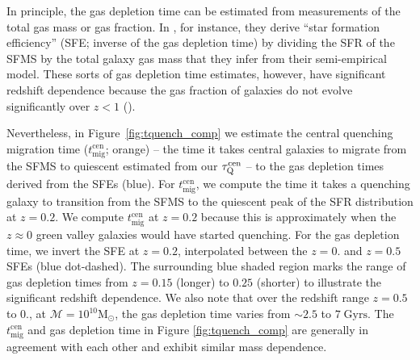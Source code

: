 In principle, the gas depletion time can be estimated from 
measurements of the total gas mass or gas fraction. 
In \cite{Popping:2015aa}, for instance, they derive 
``star formation efficiency'' (SFE; inverse of the gas depletion time) 
by dividing the SFR of the SFMS by the total galaxy gas mass that 
they infer from their semi-empirical model. These sorts of gas 
depletion time estimates, however, have significant redshift 
dependence because the gas fraction of galaxies do not evolve 
significantly over $z < 1$ 
(\citealt{Stewart:2009aa, Santini:2014aa, Popping:2015aa}).

Nevertheless, in Figure~\ref{fig:tquench_comp} we estimate the  central quenching 
migration time ($t_\mathrm{mig}^\mathrm{cen}$; orange) -- the time it takes
central galaxies to migrate from the SFMS to quiescent estimated from 
our $\tau_\mathrm{Q}^\mathrm{cen}$ -- to the gas depletion times derived from 
the \cite{Popping:2015aa} SFEs (blue). For $t_\mathrm{mig}^\mathrm{cen}$, 
we compute the time it takes a quenching galaxy to transition from 
the SFMS to the quiescent peak of the SFR distribution at $z = 0.2$. 
We compute $t_\mathrm{mig}^\mathrm{cen}$ at $z = 0.2$ because this 
is approximately when the $z \approx 0$ green valley galaxies would 
have started quenching. For the gas depletion time, we invert the 
SFE at $z = 0.2$, interpolated between the $z = 0.$ and $z=0.5$ 
\cite{Popping:2015aa} SFEs (blue dot-dashed). The surrounding 
blue shaded region marks the range of gas depletion times from 
$z = 0.15$ (longer) to $0.25$ (shorter) to illustrate the significant 
redshift dependence. We also note that over the redshift range 
$z = 0.5$ to $0.$, at $\mathcal{M} = 10^{10}\mathrm{M}_\odot$, 
the \cite{Popping:2015aa} gas depletion time varies from $\sim 2.5$ 
to $7 \;\mathrm{Gyrs}$. The $t_\mathrm{mig}^\mathrm{cen}$ and
gas depletion time in Figure \ref{fig:tquench_comp} are generally 
in agreement with each other and exhibit similar mass dependence.

